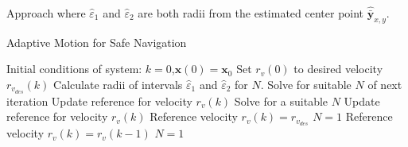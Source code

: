 \begin{section}{Approach}
where $\hat{\varepsilon}_1$ and $\hat{\varepsilon}_2$ are both radii from the estimated center point $\hat{\bar{\bm{y}}}_{x,y}$.
	


\begin{algorithm}
   \caption{Adaptive Motion for Safe Navigation} 
   \label{alg:adapt_motion} 
    \begin{algorithmic}[1]
	\State Initial conditions of system: $k=0$,$\bm{x}(0)=\bm{x}_0$
	\State Set $r_v(0)$ to desired velocity $r_{v_{des}}(k)$
        \State {}
        \State Calculate radii of intervals $\hat{\varepsilon}_1$ and $\hat{\varepsilon}_2$ for $N$.
            \State Solve for suitable $N$ of next iteration
            \State Update reference for velocity $r_v(k)$
        \Else
                \State Solve for a suitable $N$
                \State Update reference for velocity $r_v(k)$
            \Else
                    \State Reference velocity $r_v(k)=r_{v_{des}}$
                    \State $N = 1$
                \Else
                    \State Reference velocity $r_v(k) = r_v(k-1)$
                    \State $N = 1$
                \EndIf
            \EndIf
        \EndIf
    \EndWhile
	\end{algorithmic}
\end{algorithm}



\end{section} 
